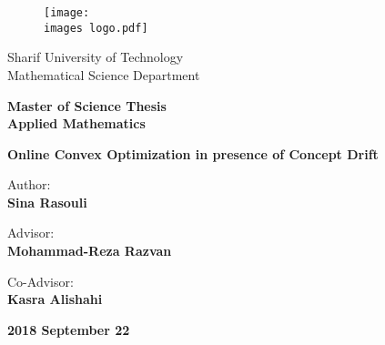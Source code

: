 \documentclass[a4paper,11px]{article}
\begin{document}
\thispagestyle{empty}
\begin{latin}

\begin{figure}[!hbt]
\centering
\texttt{[image: \\images logo.pdf]}
\centering
\end{figure}

\vspace{-5mm}
\begin{center}
\large
Sharif University of Technology\\
Mathematical Science Department
\end{center}

\vspace{5mm}
\begin{center}
\large
\textbf{
Master of Science Thesis\\
Applied Mathematics
}
\end{center}


\vspace{5mm}
\begin{center}
\Large
\textbf{
Online Convex Optimization in presence of Concept Drift
}
\end{center}


\vspace{10mm}
\begin{center}
\large
Author:
\\
\textbf{
Sina Rasouli
}
\end{center}



\vspace{10mm}
\begin{center}
\large
Advisor:
\\
\textbf{
Mohammad-Reza Razvan
}
\end{center}

\vspace{2mm}

\begin{center}
\large
Co-Advisor:
\\
\textbf{
Kasra Alishahi
}
\end{center}



\vfill
\begin{center}
\large \textbf{
2018 September 22
}
\end{center}

\end{latin}


\newpage
\end{document}
